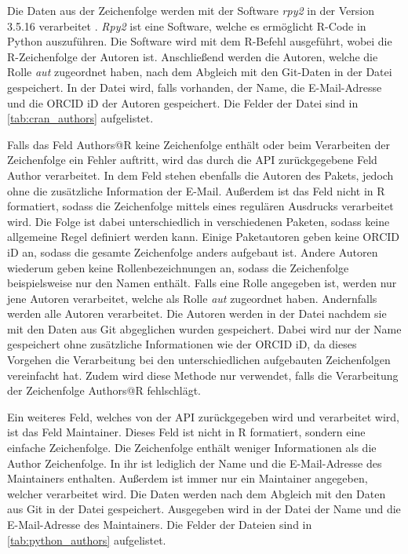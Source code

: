 Die Daten aus der Zeichenfolge werden mit der Software \emph{rpy2} in der Version 3.5.16 verarbeitet \autocite{noauthor_rpy2rpy2_2024}.
\emph{Rpy2} ist eine Software, welche es ermöglicht R-Code in Python auszuführen.
Die Software wird mit dem R-Befehl  ausgeführt, wobei  die R-Zeichenfolge der Autoren ist.
Anschließend werden die Autoren, welche die Rolle \emph{aut} zugeordnet haben, nach dem Abgleich mit den Git-Daten in der Datei  gespeichert.
In der Datei wird, falls vorhanden, der Name, die E-Mail-Adresse und die ORCID iD der Autoren gespeichert.
Die Felder der Datei sind in \autoref{tab:cran_authors} aufgelistet.

Falls das Feld \glqq Authors@R\grqq{} keine Zeichenfolge enthält oder beim Verarbeiten der Zeichenfolge ein Fehler auftritt, wird das durch die API zurückgegebene Feld \glqq Author\grqq{} verarbeitet.
In dem Feld stehen ebenfalls die Autoren des Pakets, jedoch ohne die zusätzliche Information der E-Mail.
Außerdem ist das Feld nicht in R formatiert, sodass die Zeichenfolge mittels eines regulären Ausdrucks verarbeitet wird.
Die Folge ist dabei unterschiedlich in verschiedenen Paketen, sodass keine allgemeine Regel definiert werden kann.
Einige Paketautoren geben keine ORCID iD an, sodass die gesamte Zeichenfolge anders aufgebaut ist.
Andere Autoren wiederum geben keine Rollenbezeichnungen an, sodass die Zeichenfolge beispielsweise nur den Namen enthält.
Falls eine Rolle angegeben ist, werden nur jene Autoren verarbeitet, welche als Rolle \emph{aut} zugeordnet haben.
Andernfalls werden alle Autoren verarbeitet.
Die Autoren werden in der Datei  nachdem sie mit den Daten aus Git abgeglichen wurden gespeichert.
Dabei wird nur der Name gespeichert ohne zusätzliche Informationen wie der ORCID iD, da dieses Vorgehen die Verarbeitung bei den unterschiedlichen aufgebauten Zeichenfolgen vereinfacht hat.
Zudem wird diese Methode nur verwendet, falls die Verarbeitung der Zeichenfolge \glqq Authors@R\grqq{} fehlschlägt.

Ein weiteres Feld, welches von der API zurückgegeben wird und verarbeitet wird, ist das Feld \glqq Maintainer\grqq{}.
Dieses Feld ist nicht in R formatiert, sondern eine einfache Zeichenfolge.
Die Zeichenfolge enthält weniger Informationen als die \glqq Author\grqq{} Zeichenfolge.
In ihr ist lediglich der Name und die E-Mail-Adresse des Maintainers enthalten.
Außerdem ist immer nur ein Maintainer angegeben, welcher verarbeitet wird.
Die Daten werden nach dem Abgleich mit den Daten aus Git in der Datei  gespeichert.
Ausgegeben wird in der Datei der Name und die E-Mail-Adresse des Maintainers.
Die Felder der Dateien sind in \autoref{tab:python_authors} aufgelistet.

